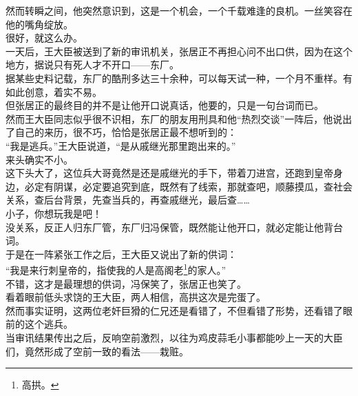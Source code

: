 \begin{multicols}{\theparacolNo}
然而转瞬之间，他突然意识到，这是一个机会，一个千载难逢的良机。一丝笑容在他的嘴角绽放。\\

很好，就这么办。\\

一天后，王大臣被送到了新的审讯机关，张居正不再担心问不出口供，因为在这个地方，据说只有死人才不开口——东厂。\\

据某些史料记载，东厂的酷刑多达三十余种，可以每天试一种，一个月不重样。有如此创意，着实不易。\\

但张居正的最终目的并不是让他开口说真话，他要的，只是一句台词而已。\\

然而王大臣同志似乎很不识相，东厂的朋友用刑具和他“热烈交谈”一阵后，他说出了自己的来历，很不巧，恰恰是张居正最不想听到的：\\

“我是逃兵。”王大臣说道，“是从戚继光那里跑出来的。”\\

来头确实不小。\\

这下头大了，这位兵大哥竟然是还是戚继光的手下，带着刀进宫，还跑到皇帝身边，必定有阴谋，必定要追究到底，既然有了线索，那就查吧，顺藤摸瓜，查社会关系，查后台背景，先查当兵的，再查戚继光，最后查……\\

小子，你想玩我是吧！\\

没关系，反正人归东厂管，东厂归冯保管，既然能让他开口，就必定能让他背台词。\\

于是在一阵紧张工作之后，王大臣又说出了新的供词：\\

“我是来行刺皇帝的，指使我的人是高阁老\footnote{高拱。}的家人。”\\

不错，这才是最理想的供词，冯保笑了，张居正也笑了。\\

看着眼前低头求饶的王大臣，两人相信，高拱这次是完蛋了。\\

然而事实证明，这两位老奸巨猾的仁兄还是看错了，不但看错了形势，还看错了眼前的这个逃兵。\\

当审讯结果传出之后，反响空前激烈，以往为鸡皮蒜毛小事都能吵上一天的大臣们，竟然形成了空前一致的看法——栽赃。\\


\end{multicols}
